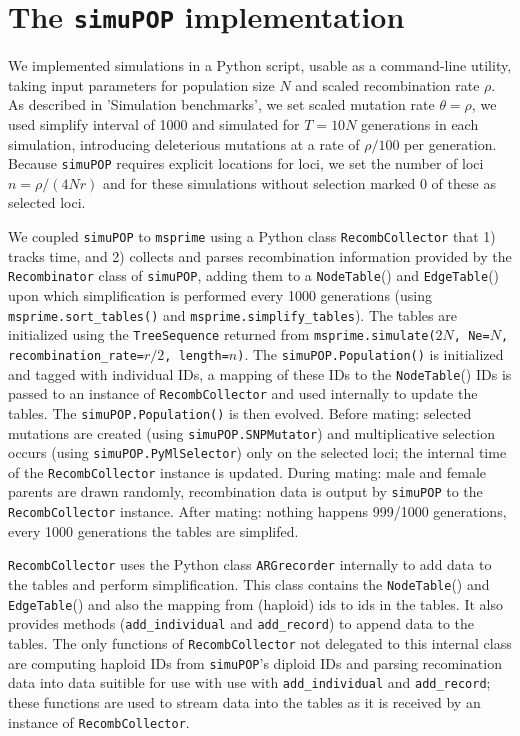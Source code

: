 \documentclass{article}
\newcommand{\simupop}{\texttt{simuPOP}}
\newcommand{\msprime}{\texttt{msprime}}
\newcommand{\tnodetable}[1]{\mbox{\texttt{NodeTable}}(#1)}
\newcommand{\tedgetable}[1]{\mbox{\texttt{EdgeTable}}(#1)}
\begin{document}
\section{The \simupop{} implementation}
\label{ss:simupop}

We implemented simulations in a Python script, usable as a command-line utility,
taking input parameters for population size $N$ and scaled recombination rate $\rho$.
As described in 'Simulation benchmarks', we set scaled mutation rate $\theta=\rho$,
we used simplify interval of 1000 and simulated for $T=10N$ generations in each
simulation, introducing deleterious mutations at a rate of $\rho/100$ per
generation.
Because \simupop{} requires explicit locations for loci, we set the number of
loci $n=\rho / (4Nr)$ and for these simulations without selection marked $0$ of
these as selected loci.

We coupled \simupop{} to \msprime{} using a Python class \texttt{RecombCollector} that 1)
tracks time, and 2) collects and parses recombination information provided by
the \texttt{Recombinator} class of \simupop{}, adding them to a \tnodetable{} and
\tedgetable{} upon which simplification is performed every 1000 generations (using
\texttt{msprime.sort\_tables()} and \texttt{msprime.simplify\_tables}).
The tables are initialized using the \texttt{TreeSequence} returned from
\texttt{msprime.simulate($2N$, Ne=$N$, recombination\_rate=$r/2$, length=$n$)}.
The \texttt{simuPOP.Population()} is initialized and tagged with individual IDs,
a mapping of these IDs to the \tnodetable{} IDs is passed to
an instance of \texttt{RecombCollector} and used internally to update the tables.
The \texttt{simuPOP.Population()} is then evolved.
Before mating: selected mutations are created (using
\texttt{simuPOP.SNPMutator}) and multiplicative selection occurs (using
\texttt{simuPOP.PyMlSelector}) only on the selected loci;
the internal time of the \texttt{RecombCollector} instance is updated.
During mating: male and female parents are drawn randomly, recombination data is
output by \simupop{} to the \texttt{RecombCollector} instance.
After mating: nothing happens 999/1000 generations, every 1000 generations the tables are
simplifed.

\texttt{RecombCollector} uses the Python class \texttt{ARGrecorder} internally
to add data to the tables and perform simplification.
This class contains the \tnodetable{} and \tedgetable{} and also the mapping from
(haploid) ids to ids in the tables.
It also provides methods (\texttt{add\_individual} and \texttt{add\_record})
to append data to the tables.
The only functions of
\texttt{RecombCollector} not delegated to this internal class are computing
haploid IDs from \simupop{}'s diploid IDs and parsing recomination data into
data suitible for use with use with \texttt{add\_individual} and
\texttt{add\_record}; these functions are used to stream data into the tables as
it is received by an instance of \texttt{RecombCollector}.
\end{document}
